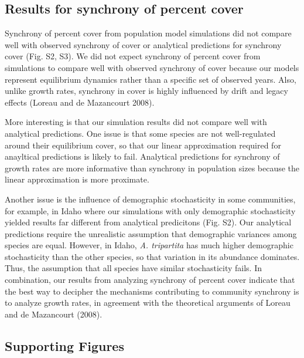 \documentclass[12pt,]{article}
\begin{document}
\newpage{}

\subsection{Results for synchrony of percent
cover}\label{results-for-synchrony-of-percent-cover}

Synchrony of percent cover from population model simulations did not
compare well with observed synchrony of cover or analytical predictions
for synchrony cover (Fig. S2, S3). We did not expect synchrony of
percent cover from simulations to compare well with observed synchrony
of cover because our models represent equilibrium dynamics rather than a
specific set of observed years. Also, unlike growth rates, synchrony in
cover is highly influenced by drift and legacy effects (Loreau and {{de
Mazancourt}} 2008).

More interesting is that our simulation results did not compare well
with analytical predictions. One issue is that some species are not
well-regulated around their equilibrium cover, so that our linear
approximation required for anayltical predictions is likely to fail.
Analytical predictions for synchrony of growth rates are more
informative than synchrony in population sizes because the linear
approximation is more proximate.

Another issue is the influence of demographic stochasticity in some
communities, for example, in Idaho where our simulations with only
demographic stochasticity yielded results far different from analytical
predicitons (Fig. S2). Our analytical predictions require the
unrealistic assumption that demographic variances among species are
equal. However, in Idaho, \emph{A. tripartita} has much higher
demographic stochasticity than the other species, so that variation in
its abundance dominates. Thus, the assumption that all species have
similar stochasticity fails. In combination, our results from analyzing
synchrony of percent cover indicate that the best way to decipher the
mechanisms contributing to community synchrony is to analyze growth
rates, in agreement with the theoretical arguments of Loreau and {{de
Mazancourt}} (2008).

\newpage{}

\subsection{Supporting Figures}\label{supporting-figures}
\end{document}
